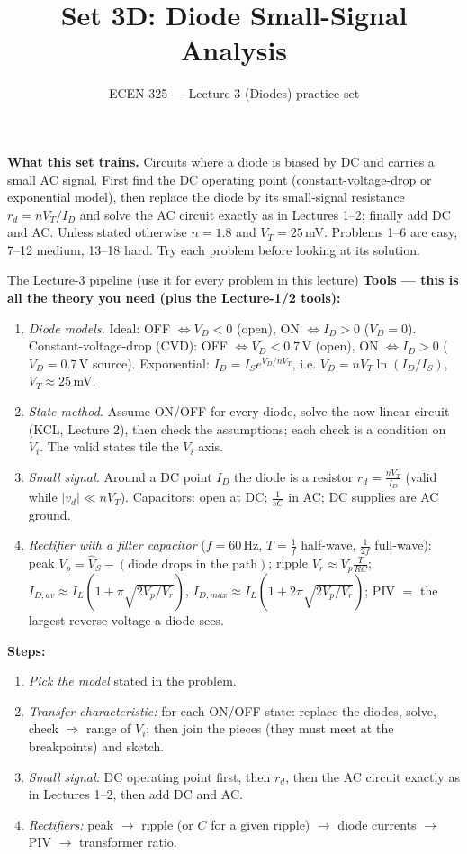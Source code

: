 \documentclass[11pt]{article}
\title{Set 3D: Diode Small-Signal Analysis}
\author{ECEN 325 --- Lecture 3 (Diodes) practice set}
\date{}
\begin{document}
\maketitle

\textbf{What this set trains.} Circuits where a diode is biased by DC and carries a small AC signal. First find the
DC operating point (constant-voltage-drop or exponential model), then replace the diode by its small-signal
resistance $r_d = nV_T/I_D$ and solve the AC circuit exactly as in Lectures 1--2; finally add DC and AC.
Unless stated otherwise $n = 1.8$ and $V_T = 25$\,mV. Problems 1--6 are easy, 7--12 medium, 13--18 hard. Try each
problem before looking at its solution.


\begin{cardbox}{The Lecture-3 pipeline (use it for every problem in this lecture)}
\textbf{Tools --- this is all the theory you need (plus the Lecture-1/2 tools):}
\begin{enumerate}[label=\textbf{T\arabic*},leftmargin=2.2em,itemsep=1pt]
\item \emph{Diode models.} Ideal: OFF $\Leftrightarrow V_D<0$ (open), ON $\Leftrightarrow I_D>0$ ($V_D=0$).
      Constant-voltage-drop (CVD): OFF $\Leftrightarrow V_D<0.7$\,V (open), ON $\Leftrightarrow I_D>0$ ($V_D=0.7$\,V source).
      Exponential: $I_D = I_S e^{V_D/nV_T}$, i.e. $V_D = nV_T\ln(I_D/I_S)$, $V_T\approx 25$\,mV.
\item \emph{State method.} Assume ON/OFF for every diode, solve the now-linear circuit (KCL, Lecture 2), then check
      the assumptions; each check is a condition on $V_i$. The valid states tile the $V_i$ axis.
\item \emph{Small signal.} Around a DC point $I_D$ the diode is a resistor $r_d = \frac{nV_T}{I_D}$
      (valid while $|v_d|\ll nV_T$). Capacitors: open at DC; $\frac{1}{sC}$ in AC; DC supplies are AC ground.
\item \emph{Rectifier with a filter capacitor} ($f=60$\,Hz, $T = \frac{1}{f}$ half-wave, $\frac{1}{2f}$ full-wave):
      peak $V_p=\hat V_S - (\text{diode drops in the path})$; ripple $V_r \approx V_p\frac{T}{RC}$;
      $I_{D,av} \approx I_L\left(1+\pi\sqrt{2V_p/V_r}\right)$, $I_{D,max}\approx I_L\left(1+2\pi\sqrt{2V_p/V_r}\right)$;
      PIV $=$ the largest reverse voltage a diode sees.
\end{enumerate}
\textbf{Steps:}
\begin{enumerate}[leftmargin=2.2em,itemsep=1pt]
\item \emph{Pick the model} stated in the problem.
\item \emph{Transfer characteristic:} for each ON/OFF state: replace the diodes, solve, check $\Rightarrow$ range of $V_i$;
      then join the pieces (they must meet at the breakpoints) and sketch.
\item \emph{Small signal:} DC operating point first, then $r_d$, then the AC circuit exactly as in Lectures 1--2,
      then add DC and AC.
\item \emph{Rectifiers:} peak $\to$ ripple (or $C$ for a given ripple) $\to$ diode currents $\to$ PIV $\to$ transformer ratio.
\end{enumerate}
\end{cardbox}
\end{document}
